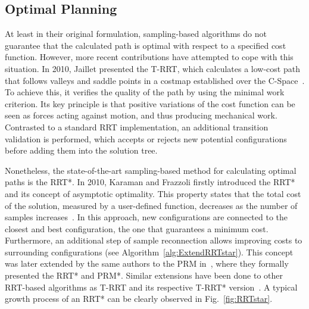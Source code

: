 \subsection{Optimal Planning}
\label{sec:SamplOptimalPlan}

At least in their original formulation, sampling-based algorithms do not
guarantee that the calculated path is optimal with respect to a specified cost
function. However, more recent contributions have attempted to cope with this
situation. In 2010, Jaillet \etal presented the \ac{T-RRT}, which calculates a
low-cost path that follows valleys and saddle points in a costmap established
over the \ac{C-Space}~\cite{Jaillet2010}. To achieve this, it verifies the
quality of the path by using the minimal work criterion. Its key principle is
that positive variations of the cost function can be seen as forces acting
against motion, and thus producing mechanical work. Contrasted to a standard
\ac{RRT} implementation, an additional transition validation is performed, which
accepts or rejects new potential configurations before adding them into the
solution tree.

Nonetheless, the state-of-the-art sampling-based method for calculating optimal
paths is the \ac{RRT*}. In 2010, Karaman and Frazzoli firstly introduced the
\ac{RRT*} and its concept of asymptotic optimality. This property states that
the total cost of the solution, measured by a user-defined function, decreases
as the number of samples increases~\cite{Karaman2010a}. In this approach, new
configurations are connected to the closest and best configuration, \ie the one
that guarantees a minimum cost. Furthermore, an additional step of sample
reconnection allows improving costs to surrounding configurations (see
Algorithm~\ref{alg:ExtendRRTstar}). This concept was later extended by the same
authors to the \ac{PRM} in~\cite{Karaman2011}, where they formally presented the
\ac{RRT*} and PRM*. Similar extensions have been done to other RRT-based
algorithms as \ac{T-RRT} and its respective T-RRT* version~\cite{Devaurs2016}. A
typical growth process of an \ac{RRT*} can be clearly observed in
Fig.~\ref{fig:RRTstar}.

